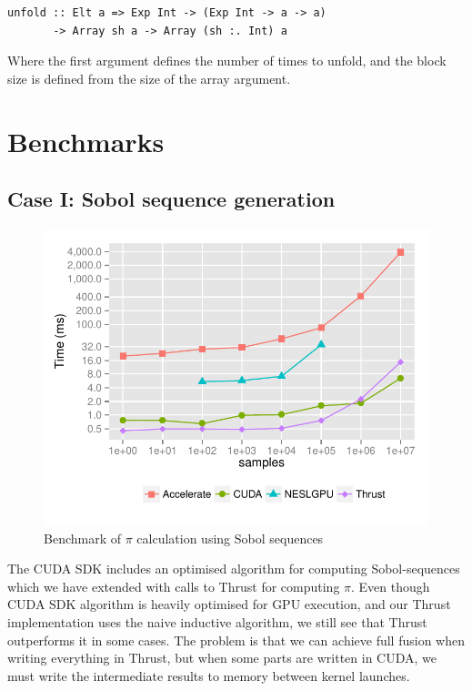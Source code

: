 \documentclass[preprint]{sigplanconf}
\begin{document}
\begin{verbatim}
unfold :: Elt a => Exp Int -> (Exp Int -> a -> a)
       -> Array sh a -> Array (sh :. Int) a
\end{verbatim}
Where the first argument defines the number of times to unfold, and
the block size is defined from the size of the array argument.


\section{Benchmarks}

\subsection{Case I: Sobol sequence generation}
\begin{figure}
  \centering
  \includegraphics[width=\columnwidth]{figures/sobol-time-graph.pdf}
  \caption{Benchmark of $\pi$ calculation using Sobol sequences}
  \label{fig:bench_sobol}
\end{figure}

The CUDA SDK includes an optimised algorithm for computing
Sobol-sequences which we have extended with calls to Thrust for
computing $\pi$. Even though CUDA SDK algorithm is heavily optimised
for GPU execution, and our Thrust implementation uses the naive
inductive algorithm, we still see that Thrust outperforms it in some
cases. The problem is that we can achieve full fusion when writing
everything in Thrust, but when some parts are written in CUDA, we must
write the intermediate results to memory between kernel launches.
\end{document}
